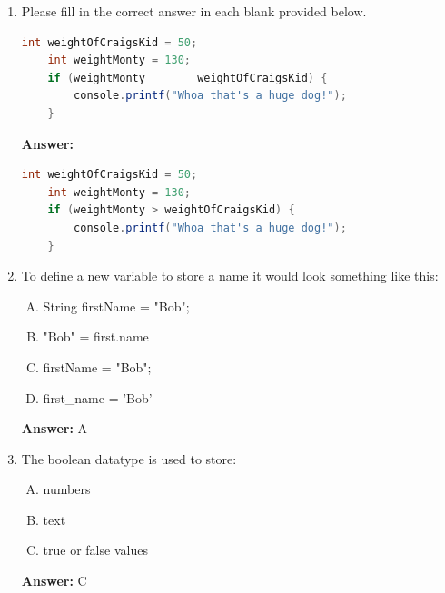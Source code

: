 \documentclass[12pt]{article}
\begin{document}
\begin{enumerate}[1.]
    \item Please fill in the correct answer in each blank provided below.

    \bigskip

    \begin{lstlisting}[language=Java]
    int weightOfCraigsKid = 50;
    int weightMonty = 130;
    if (weightMonty ______ weightOfCraigsKid) {
        console.printf("Whoa that's a huge dog!");
    }
    \end{lstlisting}

    \bigskip

    \textbf{Answer:}

    \bigskip

    \begin{lstlisting}[language=Java]
    int weightOfCraigsKid = 50;
    int weightMonty = 130;
    if (weightMonty > weightOfCraigsKid) {
        console.printf("Whoa that's a huge dog!");
    }
    \end{lstlisting}

    \item To define a new variable to store a name it would look something like
    this:

    \bigskip

    \begin{enumerate}[A.]
        \item String firstName = "Bob";
        \item "Bob" = first.name
        \item firstName = "Bob";
        \item first\_name = 'Bob'
    \end{enumerate}

    \bigskip

    \textbf{Answer:} A

    \item The boolean datatype is used to store:

    \bigskip

    \begin{enumerate}[A.]
        \item numbers
        \item text
        \item true or false values
    \end{enumerate}

    \bigskip

    \textbf{Answer:} C

\end{enumerate}
\end{document}
